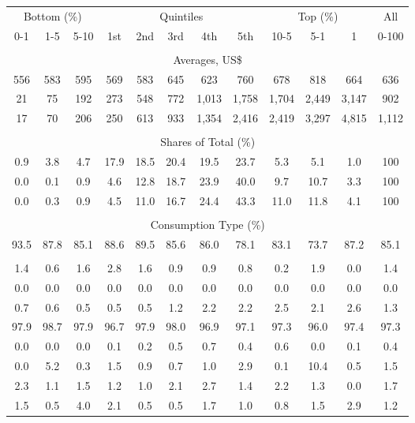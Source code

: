 \begin{tabular}{c c c| c c c c c| c c c| c}
\toprule
\multicolumn{3}{c|}{Bottom (\%)} & \multicolumn{5}{c|}{Quintiles} & \multicolumn{3}{c|}{Top (\%)} & All  \\
0-1 & 1-5 & 5-10 &  1st & 2nd & 3rd & 4th & 5th & 10-5 & 5-1 & 1 & 0-100 \\
\midrule \\
\multicolumn{12}{c}{Averages, US\$} \\
\midrule
556  & 583  & 595  & 569  & 583  & 645  & 623  & 760  & 678  & 818  & 664  & 636 \\
21 & 75 & 192 & 273 & 548 & 772 & 1,013 & 1,758 & 1,704 & 2,449 & 3,147 & 902 \\
17 & 70 & 206 & 250 & 613 & 933 & 1,354 & 2,416 & 2,419 & 3,297 & 4,815 & 1,112 \\
\midrule \\
\multicolumn{12}{c}{Shares of Total (\%)} \\
\midrule
0.9   & 3.8   & 4.7   & 17.9   & 18.5   & 20.4   & 19.5   & 23.7   & 5.3   & 5.1   & 1.0   & 100 \\
0.0  & 0.1  & 0.9  & 4.6  & 12.8  & 18.7  & 23.9  & 40.0  & 9.7  & 10.7  & 3.3  & 100 \\
0.0  & 0.3  & 0.9  & 4.5  & 11.0  & 16.7  & 24.4  & 43.3  & 11.0  & 11.8  & 4.1  & 100 \\
\midrule \\
\multicolumn{12}{c}{Consumption Type (\%)}  \\
\midrule
93.5 & 87.8 & 85.1 & 88.6 & 89.5 & 85.6 & 86.0 & 78.1 & 83.1 & 73.7 & 87.2 & 85.1 \\
 & & & & & & & & & & &  \\
1.4 & 0.6 & 1.6 & 2.8 & 1.6 & 0.9 & 0.9 & 0.8 & 0.2 & 1.9 & 0.0 & 1.4 \\
0.0 & 0.0 & 0.0 & 0.0 & 0.0 & 0.0 & 0.0 & 0.0 & 0.0 & 0.0 & 0.0 & 0.0 \\
0.7 & 0.6 & 0.5 & 0.5 & 0.5 & 1.2 & 2.2 & 2.2 & 2.5 & 2.1 & 2.6 & 1.3 \\
97.9 & 98.7 & 97.9 & 96.7 & 97.9 & 98.0 & 96.9 & 97.1 & 97.3 & 96.0 & 97.4 & 97.3 \\
0.0 & 0.0 & 0.0 & 0.1 & 0.2 & 0.5 & 0.7 & 0.4 & 0.6 & 0.0 & 0.1 & 0.4 \\
0.0 & 5.2 & 0.3 & 1.5 & 0.9 & 0.7 & 1.0 & 2.9 & 0.1 & 10.4 & 0.5 & 1.5 \\
2.3 & 1.1 & 1.5 & 1.2 & 1.0 & 2.1 & 2.7 & 1.4 & 2.2 & 1.3 & 0.0 & 1.7 \\
1.5 & 0.5 & 4.0 & 2.1 & 0.5 & 0.5 & 1.7 & 1.0 & 0.8 & 1.5 & 2.9 & 1.2 \\

\end{tabular}
